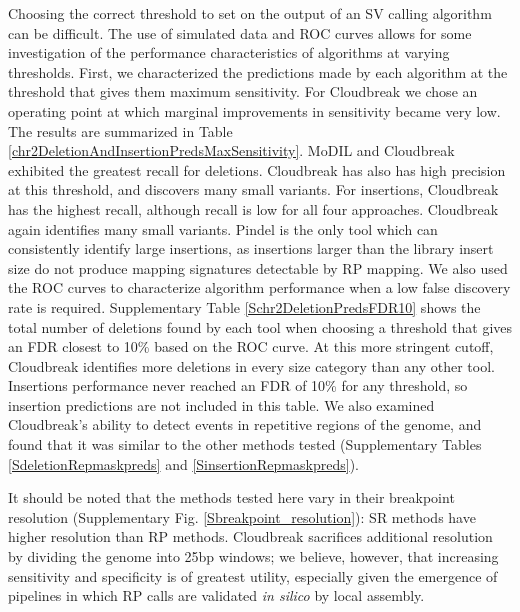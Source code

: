 \documentclass[11pt]{article}
\begin{document}
Choosing the correct threshold to set on the output of an SV calling algorithm can be difficult. The use of simulated data and ROC curves allows for some investigation of the performance characteristics of algorithms at varying thresholds. First, we characterized the predictions made by each algorithm at the threshold that gives them maximum sensitivity. For Cloudbreak we chose an operating point at which marginal improvements in sensitivity became very low. The results are summarized in Table \ref{chr2DeletionAndInsertionPredsMaxSensitivity}. MoDIL and Cloudbreak exhibited the greatest recall for deletions. Cloudbreak has also has high precision at this threshold, and discovers many small variants. For insertions, Cloudbreak has the highest recall, although recall is low for all four approaches. Cloudbreak again identifies many small variants. Pindel is the only tool which can consistently identify large insertions, as insertions larger than the library insert size do not produce mapping signatures detectable by RP mapping. We also used the ROC curves to characterize algorithm performance when a low false discovery rate is required. Supplementary Table \ref{Schr2DeletionPredsFDR10} shows the total number of deletions found by each tool when choosing a threshold that gives an FDR closest to 10\% based on the ROC curve. At this more stringent cutoff, Cloudbreak identifies more deletions in every size category than any other tool. Insertions performance never reached an FDR of 10\% for any threshold, so insertion predictions are not included in this table. We also examined Cloudbreak's ability to detect events in repetitive regions of the genome, and found that it was similar to the other methods tested (Supplementary Tables \ref{SdeletionRepmaskpreds} and \ref{SinsertionRepmaskpreds}).

It should be noted that the methods tested here vary in their breakpoint resolution (Supplementary Fig. \ref{Sbreakpoint_resolution}): SR methods have higher resolution than RP methods. Cloudbreak sacrifices additional resolution by dividing the genome into 25bp windows; we believe, however, that increasing sensitivity and specificity is of greatest utility, especially given the emergence of pipelines in which RP calls are validated \emph{in silico} by local assembly.
\end{document}
